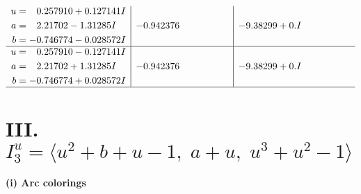 \documentclass[1p]{elsarticle_modified}
\theoremstyle{definition}
\begin{document}
$$\begin{array}{c|c|c}
\begin{aligned}
u &= \phantom{-}0.257910 + 0.127141 I \\
a &= \phantom{-}2.21702 - 1.31285 I \\
b &= -0.746774 - 0.028572 I\end{aligned}
 & -0.942376\phantom{ +0.000000I} & -9.38299 + 0. I\phantom{ +0.000000I} \\ \hline\begin{aligned}
u &= \phantom{-}0.257910 - 0.127141 I \\
a &= \phantom{-}2.21702 + 1.31285 I \\
b &= -0.746774 + 0.028572 I\end{aligned}
 & -0.942376\phantom{ +0.000000I} & -9.38299 + 0. I\phantom{ +0.000000I}\\
 \hline 
 \end{array}$$\newpage\newpage\renewcommand{\arraystretch}{1}
\centering \section*{III. $I^u_{3}= \langle u^2+b+u-1,\;a+u,\;u^3+u^2-1 \rangle$}
\flushleft \textbf{(i) Arc colorings}\\
\end{document}

